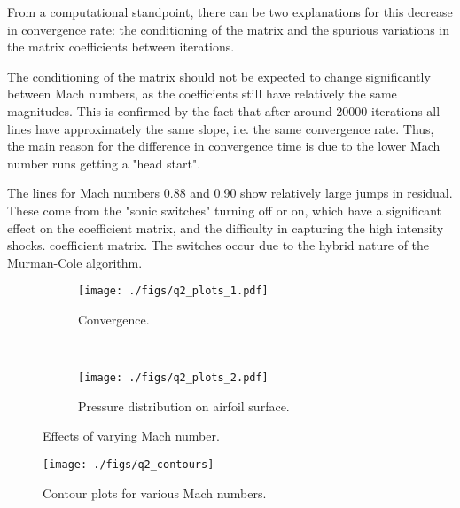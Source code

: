 \documentclass{SelimArticle}
\begin{document}
From a computational standpoint, there can be two explanations for this decrease
in convergence rate: the conditioning of the
matrix and the spurious variations in the matrix coefficients between iterations.

The conditioning of the matrix should not be expected to change significantly between
Mach numbers, as the coefficients still have relatively the same magnitudes. This is
confirmed by the fact that after around 20000 iterations all lines have approximately
the same slope, i.e. the same convergence rate. Thus, the main reason for the difference in
convergence time is due to the lower Mach number runs getting a "head start".

The lines for Mach numbers 0.88 and 0.90 show relatively large jumps in residual. These come from
the "sonic switches" turning off or on, which have a significant effect on the coefficient matrix,
and the difficulty in capturing the high intensity shocks.
coefficient matrix. The switches occur due to the hybrid nature of the Murman-Cole algorithm.

\begin{figure}
    \centering
    \begin{subfigure}{0.8\textwidth}
    \texttt{[image: ./figs/q2\_plots\_1.pdf]}
    \caption{Convergence.}\label{fig:q2_convergence}
    \end{subfigure}
    \\
    \begin{subfigure}{0.8\textwidth}
    \texttt{[image: ./figs/q2\_plots\_2.pdf]}
    \caption{Pressure distribution on airfoil surface.}\label{fig:q2_pressure}
    \end{subfigure}
    \caption{Effects of varying Mach number.}\label{fig:q2_plots}
\end{figure}

\begin{figure}[H]
    \centering
    \texttt{[image: ./figs/q2\_contours]}
    \caption{Contour plots for various Mach numbers.}\label{fig:q2_contours}
\end{figure}


\newpage
\end{document}
